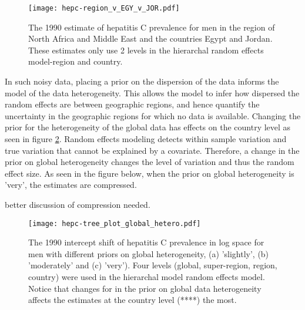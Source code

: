     \begin{figure}[h]
        \begin{center}
            \texttt{[image: hepc-region\_v\_EGY\_v\_JOR.pdf]}
            \caption{The 1990 estimate of hepatitis C prevalence for men in the region of North Africa and Middle East and the countries Egypt and Jordan.  These estimates only use 2 levels in the hierarchal random effects model-region and country.}
            \label{fig:app-hepc regional rfx}
        \end{center}
    \end{figure}

In such noisy data, placing a prior on the dispersion of the data informs the model of the data heterogeneity.  This allows the model to infer how dispersed the random effects are between geographic regions, and hence quantify the uncertainty in the geographic regions for which no data is available.  Changing the prior for the heterogeneity of the global data has effects on the country level as seen in figure \ref{fig:app-hepc global hetero}.  Random effects modeling detects within sample variation and true variation that cannot be explained by a covariate.  Therefore, a change in the prior on global heterogeneity changes the level of variation and thus the random effect size.  As seen in the figure below, when the prior on global heterogeneity is 'very', the estimates are compressed.

better discussion of compression needed.

    \begin{figure}[h]
        \begin{center}
            \texttt{[image: hepc-tree\_plot\_global\_hetero.pdf]}
            \caption{The 1990 intercept shift of hepatitis C prevalence  in log space for men with different priors on global heterogeneity, (a) 'slightly', (b) 'moderately' and (c) 'very').  Four levels (global, super-region, region, country) were used in the hierarchal model random effects model.  Notice that changes for in the prior on global data heterogeneity affects the estimates at the country level (****) the most.}
            \label{fig:app-hepc global hetero}
        \end{center}
    \end{figure}
